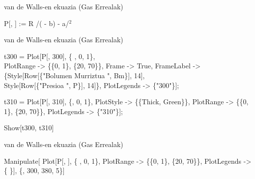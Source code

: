 \documentclass[xcolor=x11names,table]{beamer}
\begin{document}
\begin{frame}{van de Walls-en ekuazia (Gas Errealak)}


	P[{\color{green}{\em Bm\_ }}, {\color{green}{\em T\_ }}] := R {\color{green}{\em T}} /({\color{green}{\em Bm}} -
	b) - a/{\color{green}{\em Bm}}$^2$ 

	\vspace{1cm}
	\begin{center}
	\end{center}

\end{frame}
\begin{frame}{van de Walls-en ekuazia (Gas Errealak)}

	t300 = Plot[P[{\color{blue}{Bm}}, 300], \{ {\color{blue}{Bm}}, 0, 1\}, \\
	PlotRange -> \{\{0, 1\}, \{20, 70\}\}, Frame -> True, FrameLabel -> \{Style[Row[\{"Bolumen Murriztua ", Bm\}], 14], \\
Style[Row[\{"Presioa ", P\}], 14]\}, PlotLegends -> \{"300"\}];
\vspace{.8 cm}



t310 = Plot[P[{\color{blue}{Bm}}, 310], \{{\color{blue}{Bm}}, 0, 1\}, PlotStyle -> \{\{Thick, Green\}\},
PlotRange -> \{\{0, 1\}, \{20, 70\}\}, PlotLegends -> \{"310"\}];
\vspace{.8 cm}

Show[t300, t310]


\end{frame}
\begin{frame}{van de Walls-en ekuazia (Gas Errealak)}

	Manipulate[ Plot[P[{\color{blue}{Bm}}, {\color{blue}{T}}], \{ {\color{blue}{Bm}}, 0, 1\}, PlotRange -> \{\{0, 1\},
	\{20, 70\}\}, 
	PlotLegends -> \{{\color{blue}{T}} \}], \{{\color{blue}{T}}, 300, 380, 5\}]

\end{frame}
\end{document}
